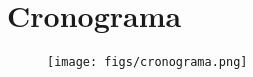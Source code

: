 \chapter{Cronograma}\label{cap:cronograma}


\begin{figure}[h]
    \center
    \texttt{[image: figs/cronograma.png]}
\end{figure}

